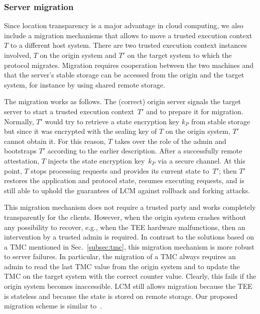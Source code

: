 \documentclass[11pt]{article}
\theoremstyle{plain-boldhead}
\theoremstyle{definition-boldhead}
\newcommand{\pp}{LCM\xspace}
\begin{document}
\subsubsection{Server migration}

Since location transparency is a major advantage in cloud computing, we
also include a migration mechanisms that allows to move a trusted execution
context~$T$ to a different host system.
% 
There are two trusted execution context instances involved, $T$ on the origin
system and $T'$ on the target system to which the protocol migrates.
% 
Migration requires cooperation between the two machines and that the
server's stable storage can be accessed from the origin and the target
system, for instance by using shared remote storage.

The migration works as follows.  The (correct) origin server signals the
target server to start a trusted execution context~$T'$ and to prepare it
for migration.  Normally, $T'$ would try to retrieve a state encryption key
$k_P$ from stable storage but since it was encrypted with the sealing key
of $T$ on the origin system, $T'$ cannot obtain it.  For this reason, $T$
takes over the role of the admin and bootstraps $T'$ according to the
earlier description.  After a successfully remote attestation, $T$ injects the
state encryption key~$k_P$ via a secure channel.  At this point, $T$ stops
processing requests and provides its current state to~$T'$; then $T'$
restores the application and protocol state, resumes executing requests,
and is still able to uphold the guarantees of \pp against rollback and forking
attacks.

This migration mechanism does not require a trusted party and works
completely transparently for the clients.  However, when the origin system
crashes without any possibility to recover, e.g., when the TEE hardware
malfunctions, then an intervention by a trusted admin is required.
%
In contrast to the solutions based on a TMC mentioned in
Sec.~\ref{subsec:tmc}, this migration mechanism is more robust to server
failures.  In particular, the migration of a TMC always requires an admin
to read the last TMC value from the origin system and to update the TMC on
the target system with the correct counter value.  Clearly, this fails if
the origin system becomes inaccessible.  \pp still allows migration because
the TEE is stateless and because the state is stored on remote storage.
Our proposed migration scheme is similar to~\cite{strackx2015}.
\end{document}
